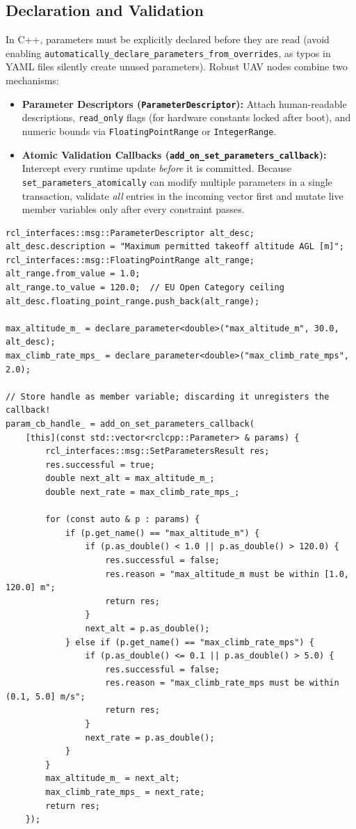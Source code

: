 \documentclass{article}
\begin{document}
\subsection{Declaration and Validation}
In C++, parameters must be explicitly declared before they are read (avoid enabling \texttt{automatically\_declare\_\allowbreak parameters\_from\_overrides}, as typos in YAML files silently create unused parameters). Robust UAV nodes combine two mechanisms:
\begin{itemize}
    \item \textbf{Parameter Descriptors (\texttt{ParameterDescriptor}):} Attach human-readable descriptions, \texttt{read\_only} flags (for hardware constants locked after boot), and numeric bounds via \texttt{FloatingPointRange} or \texttt{IntegerRange}.
    \item \textbf{Atomic Validation Callbacks (\texttt{add\_on\_set\_\allowbreak parameters\_callback}):} Intercept every runtime update \textit{before} it is committed. Because \texttt{set\_parameters\_atomically} can modify multiple parameters in a single transaction, validate \textit{all} entries in the incoming vector first and mutate live member variables only after every constraint passes.
\end{itemize}

\begin{verbatim}
rcl_interfaces::msg::ParameterDescriptor alt_desc;
alt_desc.description = "Maximum permitted takeoff altitude AGL [m]";
rcl_interfaces::msg::FloatingPointRange alt_range;
alt_range.from_value = 1.0;
alt_range.to_value = 120.0;  // EU Open Category ceiling
alt_desc.floating_point_range.push_back(alt_range);

max_altitude_m_ = declare_parameter<double>("max_altitude_m", 30.0, alt_desc);
max_climb_rate_mps_ = declare_parameter<double>("max_climb_rate_mps", 2.0);

// Store handle as member variable; discarding it unregisters the callback!
param_cb_handle_ = add_on_set_parameters_callback(
    [this](const std::vector<rclcpp::Parameter> & params) {
        rcl_interfaces::msg::SetParametersResult res;
        res.successful = true;
        double next_alt = max_altitude_m_;
        double next_rate = max_climb_rate_mps_;

        for (const auto & p : params) {
            if (p.get_name() == "max_altitude_m") {
                if (p.as_double() < 1.0 || p.as_double() > 120.0) {
                    res.successful = false;
                    res.reason = "max_altitude_m must be within [1.0, 120.0] m";
                    return res;
                }
                next_alt = p.as_double();
            } else if (p.get_name() == "max_climb_rate_mps") {
                if (p.as_double() <= 0.1 || p.as_double() > 5.0) {
                    res.successful = false;
                    res.reason = "max_climb_rate_mps must be within (0.1, 5.0] m/s";
                    return res;
                }
                next_rate = p.as_double();
            }
        }
        max_altitude_m_ = next_alt;
        max_climb_rate_mps_ = next_rate;
        return res;
    });
\end{verbatim}
\end{document}
